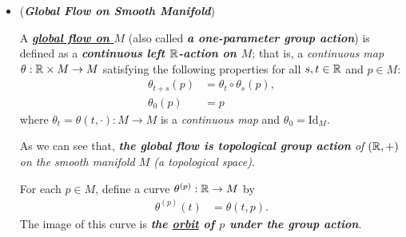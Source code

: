 \documentclass[11pt]{article}
\begin{document}
\begin{itemize}
\item \begin{example}(\emph{\textbf{Global Flow on Smooth Manifold}}) \citep{lee2003introduction}
 \begin{definition}
A \underline{\emph{\textbf{global flow on $M$}}} (also called \textbf{\emph{a one-parameter group action}}) is defined as a \emph{\textbf{continuous left ${\mathbb R}$-action on $M$}}; that is, a \emph{continuous map} $\theta:  {\mathbb R} \times M \rightarrow M$ satisfying the following properties for all $s, t \in {\mathbb R}$ and $p \in M$:
\begin{align*}
\theta_{t+s}(p) &= \theta_t \circ \theta_s(p), \\
\theta_0(p)&= p 
\end{align*} where $\theta_t = \theta(t, \cdot): M \rightarrow M$ is a \emph{continuous map} and $\theta_0 = \text{Id}_{M}$. 
\end{definition}
As we can see that, \emph{\textbf{the global flow is topological group action} of $({\mathbb R}, +)$ on the smooth manifold $M$ (a topological space)}.

 \begin{definition}
For each $p \in M$, define a curve $\theta^{(p)}: {\mathbb R} \rightarrow M$ by
\begin{align*}
\theta^{(p)}(t) &= \theta(t, p).
\end{align*} The image of this curve is \emph{\textbf{the \underline{orbit} of $p$ under the group action}}.
\end{definition}
\end{example}
\end{itemize}


\newpage


\end{document}
